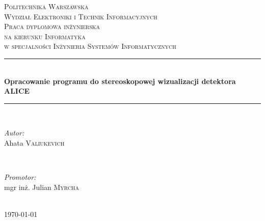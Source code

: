 \documentclass[paper=a4, fontsize=11pt]{scrartcl} %
\begin{document}
\begin{titlepage}

\newcommand{\HRule}{\rule{\linewidth}{0.5mm}} %

\center %
\textsc{\LARGE Politechnika Warszawska}\\[1.5cm] %
\textsc{\Large Wydział Elektroniki i Technik Informacyjnych}\\[0.5cm] %
\textsc{\large Praca dyplomowa inżynierska\\
na kierunku Informatyka\\
w specjalności Inżynieria Systemów Informatycznych}\\[0.5cm] %


\HRule \\[0.4cm]
{ \huge \bfseries Opracowanie programu do stereoskopowej wizualizacji detektora ALICE}\\[0.4cm] %
\HRule \\[1.5cm]
 

\begin{minipage}{0.4\textwidth}
\begin{flushleft} \large
\emph{Autor:}\\
Ahata \textsc{Valiukevich}
\end{flushleft}
\end{minipage}
~
\begin{minipage}{0.4\textwidth}
\begin{flushright} \large
\emph{Promotor:} \\
mgr inż. Julian \textsc{Myrcha} %
\end{flushright}
\end{minipage}\\[4cm]



{\large \today}\\[3cm] %
\vfill %
\end{titlepage}
\end{document}
